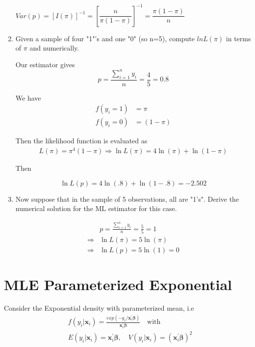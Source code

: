 \documentclass[11pt,reqno]{amsart}   %
\newcommand{\mlt}[1]{\mathbf{#1}} %
\newcommand{\mgr}[1]{\boldsymbol{#1}}%
\newcommand{\ksp}{\vspace{0.1in}}   %
\newcommand{\kl}{\left(}
\newcommand{\kr}{\right)}
\newcommand{\kt}{^{\prime}}
\begin{document}
\begin{enumerate}
$Var(p) =[I(\pi)]^{-1} =[\dfrac{n}{\pi(1-\pi)}]^{-1} = \dfrac{\pi(1-\pi)}{n}$

\item	Given a sample of four "1"'s and one "0" (so n=5), compute $lnL\kl \pi \kr$ in terms of $\pi$ and numerically.

Our estimator gives
$$p=\frac{\sum_{i=1}^{n} y_{i}}{n}=\frac{4}{5}=0.8$$

We have
\begin{equation*}
\begin{split}
f(y_i = 1) &= \pi\\
f(y_i = 0) &= (1 - \pi)
\end{split}
\end{equation*}

Then the likelihood function is evaluated as
\begin{equation*}
\begin{split}
L(\pi)=\pi^{4}(1-\pi) \Rightarrow \ln L(\pi)=4 \ln (\pi)+\ln (1-\pi)
\end{split}
\end{equation*}

Then

$$\ln L(p)=4 \ln (.8)+\ln (1-.8)=-2.502$$

\item	Now suppose that in the sample of 5 observations, all are "1's".  
Derive the numerical solution for the ML estimator for this case. 

\begin{equation*}
\begin{split}
& p=\frac{\sum_{i=1}^{n} y_{i}}{n}=\frac{5}{5}=1\\
\Rightarrow & \ln L(\pi)=5 \ln (\pi)\\
\Rightarrow & \ln L(p)=5 \ln (1)=0
\end{split}
\end{equation*}

\end{enumerate}

\section{MLE Parameterized Exponential}
Consider the Exponential density with parameterized mean, i.e
\begin{equation*}
\begin{split}
&f\kl y_i |\mlt{x}_i\kr = \frac{exp\kl -y_i /\mlt{x}_i\kt\mgr{\beta}\kr}{\mlt{x}_i\kt\mgr{\beta}} \quad \text{with} \\
&E\kl y_i |\mlt{x}_i\kr= \mlt{x}_i\kt\mgr{\beta}, \quad V\kl y_i|\mlt{x}_i\kr = \kl  \mlt{x}_i\kt\mgr{\beta}\kr^2
\end{split}
\end{equation*}
\ksp
\end{document}
